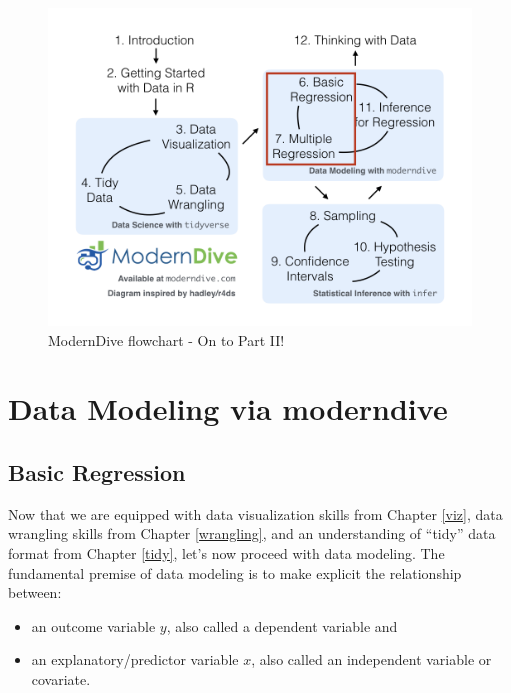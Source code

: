 \documentclass[12pt, krantz2,]{krantz}
\providecommand{\tightlist}{%
  \setlength{\itemsep}{0pt}\setlength{\parskip}{0pt}}
\begin{document}
\begin{figure}

{\centering \includegraphics[width=\textwidth]{images/flowcharts/flowchart/flowchart.005} 

}

\caption{ModernDive flowchart - On to Part II!}\label{fig:unnamed-chunk-141}
\end{figure}

\hypertarget{part-data-modeling-via-moderndive}{%
\part{Data Modeling via moderndive}\label{part-data-modeling-via-moderndive}}

\hypertarget{regression}{%
\chapter{Basic Regression}\label{regression}}

Now that we are equipped with data visualization skills from Chapter \ref{viz}, data wrangling skills from Chapter \ref{wrangling}, and an understanding of ``tidy'' data format from Chapter \ref{tidy}, let's now proceed with data modeling. The fundamental premise of data modeling is to make explicit the relationship between:

\begin{itemize}
\tightlist
\item
  an outcome variable \(y\), also called a dependent variable and
\item
  an explanatory/predictor variable \(x\), also called an independent variable or covariate.
\end{itemize}
\end{document}
